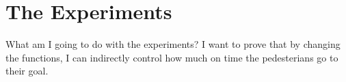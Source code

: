 \documentclass[12pt]{article}
\begin{document}
\section{The Experiments}

What am I going to do with the experiments? I want to prove that by changing the functions, I can indirectly control how much on time the pedesterians go to their goal. 
\end{document}
